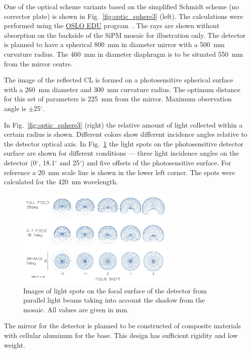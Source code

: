 \documentclass[a4paper,11pt]{article}
\begin{document}
One of the optical scheme variants based on the simplified Schmidt scheme (no corrector plate) is shown in Fig.~\ref{fig:optic_sphere3} (left). The calculations were performed using the \href{https://www.lambdares.com/oslo/}{OSLO EDU} program~\cite{Oslo}. The rays are shown without absorption on the backside of the SiPM mosaic for illustration only. The detector is planned to have a spherical 800~mm in diameter mirror with a 500~mm curvature radius. The 460~mm in diameter diaphragm is to be situated 550~mm from the mirror centre.

The image of the reflected CL is formed on a photosensitive spherical surface with a 260~mm diameter and 300~mm curvature radius. The optimum distance for this set of parameters is 225~mm from the mirror. Maximum observation angle is $\pm$25$^\circ$.

In Fig.~\ref{fig:optic_sphere3} (right) the relative amount of light collected within a certain radius is shown. Different colors show different incidence angles relative to the detector optical axis.
In Fig.~\ref{fig:spots} the light spots on the photosensitive detector surface are shown for different conditions --- three light incidence angles on the detector (0$^\circ$, 18.1$^\circ$ and 25$^\circ$) and five offsets of the photosensitive surface. For reference a 20~mm scale line is shown in the lower left corner. The spots were calculated for the 420~nm wavelength.

\begin{figure}[bt]
\centering
\includegraphics[width=0.7\textwidth]{Sphere3spot.pdf}
\caption{Images of light spots on the focal surface of the detector from parallel light beams taking into account the shadow from the mosaic. All values are given in mm.}
\label{fig:spots}
\end{figure}    

The mirror for the detector is planned to be constructed of composite materials with cellular aluminum for the base. This design has sufficient rigidity and low weight.
\end{document}

